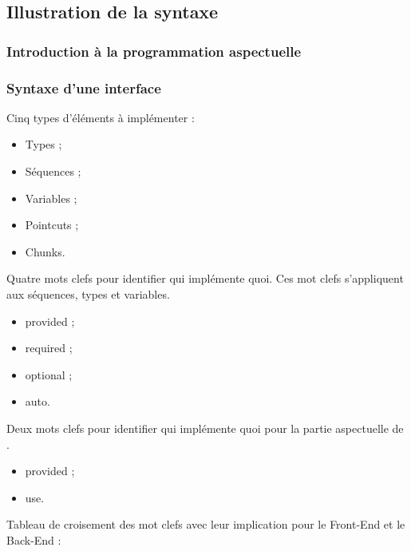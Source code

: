 \documentclass[]{beamer}
\begin{document}
\begin{frame}
\begin{columns}[c]
\end{columns}
\end{frame}

\subsection{Illustration de la syntaxe}
\begin{frame}
\frametitle{Introduction à la programmation aspectuelle}
\end{frame}


\begin{frame}
\frametitle{Syntaxe d'une interface}
 {
    Cinq types d'éléments à implémenter :
    \begin{itemize}
        \item Types ;
        \item Séquences ;
        \item Variables ;
        \item Pointcuts ;
        \item Chunks.
    \end{itemize}
}
 {
    Quatre mots clefs pour identifier qui implémente quoi.
    Ces mot clefs s'appliquent aux séquences, types et variables.
    \begin{itemize}
        \item provided ;
        \item required ;
        \item optional ;
        \item auto.
    \end{itemize}
}
 {
    Deux mots clefs pour identifier qui implémente quoi pour la partie
    aspectuelle de \rtx.
    \begin{itemize}
        \item provided ;
        \item use.
    \end{itemize}
}
 {
    Tableau de croisement des mot clefs avec leur implication pour le
    Front-End et le Back-End :
}

\end{frame}
\end{document}
